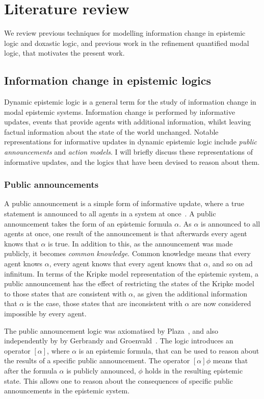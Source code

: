 \chapter{Literature review}\label{litreview}

We review previous techniques for modelling information change in epistemic
logic and doxastic logic, and previous work in the refinement quantified modal
logic, that motivates the present work.

\section{Information change in epistemic logics}

Dynamic epistemic logic is a general term for the study of information change in
modal epistemic systems. Information change is performed by informative updates,
events that provide agents with additional information, whilst leaving factual
information about the state of the world unchanged. Notable representations for
informative updates in dynamic epistemic logic include {\em public
announcements} and {\em action models}. I will briefly discuss these
representations of informative updates, and the logics that have been devised to
reason about them.

\subsection{Public announcements}

A public announcement is a simple form of informative update, where a true
statement is announced to all agents in a system at
once~\cite{vanditmarsch2007dynamic}.  A public announcement takes the form of an
epistemic formula $\alpha$. As $\alpha$ is announced to all agents at once, one
result of the announcement is that afterwards every agent knows that $\alpha$ is
true. In addition to this, as the announcement was made publicly, it becomes
{\em common knowledge}. Common knowledge means that every agent knows $\alpha$,
every agent knows that every agent knows that $\alpha$, and so on ad infinitum.
In terms of the Kripke model representation of the epistemic system, a public
announcement has the effect of restricting the states of the Kripke model to
those states that are consistent with $\alpha$, as given the additional
information that $\alpha$ is the case, those states that are inconsistent with
$\alpha$ are now considered impossible by every agent.

The public announcement logic was axiomatised by Plaza~\cite{plaza2007logics},
and also independently by by Gerbrandy and
Groenvald~\cite{gerbrandy1997reasoning}.  The logic introduces an operator
$[\alpha]$, where $\alpha$ is an epistemic formula, that can be used to reason
about the results of a specific public announcement. The operator $[\alpha]
\phi$ means that after the formula $\alpha$ is publicly announced, $\phi$ holds
in the resulting epistemic state. This allows one to reason about the
consequences of specific public announcements in the epistemic system.

